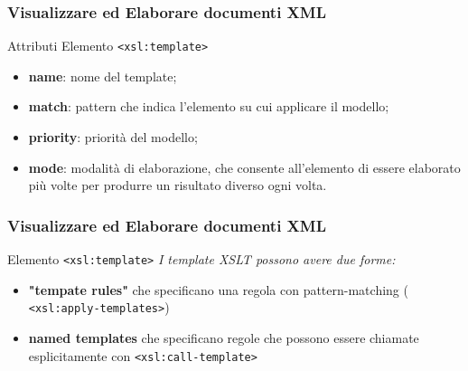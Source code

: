 \begin{frame}
    \frametitle{Visualizzare ed Elaborare documenti XML}
    \addtocounter{nframe}{1}
    

     \begin{block}{Attributi Elemento \texttt{<xsl:template>}}
         \begin{itemize}
             \item \textbf{name}: nome del template;
             \item \textbf{match}: pattern che indica l'elemento su cui applicare il modello;
             \item \textbf{priority}: priorità del modello;
             \item \textbf{mode}: modalità di elaborazione, che consente all'elemento di essere elaborato più volte per produrre un risultato diverso ogni volta.
        \end{itemize}
     \end{block}
    
\end{frame}


\begin{frame}
    \frametitle{Visualizzare ed Elaborare documenti XML}
    \addtocounter{nframe}{1}
    

     \begin{block}{Elemento \texttt{<xsl:template>}}
        \textit{I template XSLT possono avere due forme: }
        \begin{itemize}
            \item \textbf{"tempate rules"} che specificano una regola con pattern-matching ( \texttt{<xsl:apply-templates>})
            \item \textbf{named templates} che specificano regole che possono essere chiamate esplicitamente con \texttt{<xsl:call-template>}
        \end{itemize}

     \end{block}
    
\end{frame}


